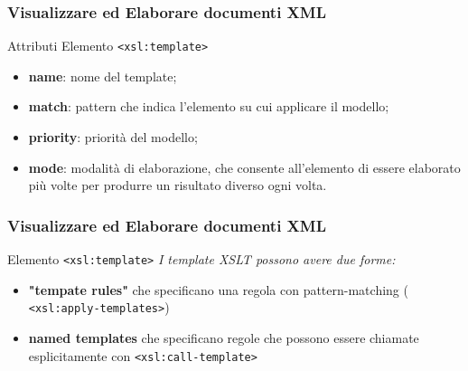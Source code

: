 \begin{frame}
    \frametitle{Visualizzare ed Elaborare documenti XML}
    \addtocounter{nframe}{1}
    

     \begin{block}{Attributi Elemento \texttt{<xsl:template>}}
         \begin{itemize}
             \item \textbf{name}: nome del template;
             \item \textbf{match}: pattern che indica l'elemento su cui applicare il modello;
             \item \textbf{priority}: priorità del modello;
             \item \textbf{mode}: modalità di elaborazione, che consente all'elemento di essere elaborato più volte per produrre un risultato diverso ogni volta.
        \end{itemize}
     \end{block}
    
\end{frame}


\begin{frame}
    \frametitle{Visualizzare ed Elaborare documenti XML}
    \addtocounter{nframe}{1}
    

     \begin{block}{Elemento \texttt{<xsl:template>}}
        \textit{I template XSLT possono avere due forme: }
        \begin{itemize}
            \item \textbf{"tempate rules"} che specificano una regola con pattern-matching ( \texttt{<xsl:apply-templates>})
            \item \textbf{named templates} che specificano regole che possono essere chiamate esplicitamente con \texttt{<xsl:call-template>}
        \end{itemize}

     \end{block}
    
\end{frame}


